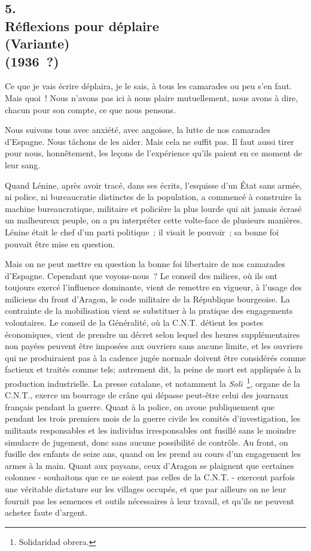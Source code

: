 \documentclass[french,twoside]{book} %
\begin{document}
\subsection[5. Réflexions pour déplaire, (Variante) (1936 ?)]{5. \\
Réflexions pour déplaire \\
(Variante) \\
(1936 ?)}
\noindent \par
Ce que je vais écrire déplaira, je le sais, à tous les camarades ou peu s'en faut. Mais quoi ! Nous n'avons pas ici à nous plaire mutuellement, nous avons à dire, chacun pour son compte, ce que nous pensons.\par
Nous suivons tous avec anxiété, avec angoisse, la lutte de nos camarades d'Espagne. Nous tâchons de les aider. Mais cela ne suffit pas. Il faut aussi tirer pour nous, honnêtement, les leçons de l'expérience qu'ils paient en ce moment de leur sang.\par
\par
Quand Lénine, après avoir tracé, dans ses écrits, l'esquisse d'un État sans armée, ni police, ni bureaucratie distinctes de la population, a commencé à construire la machine bureaucratique, militaire et policière la plus lourde qui ait jamais écrasé un malheureux peuple, on a pu interpréter cette volte-face de plusieurs manières. Lénine était le chef d'un parti politique ; il visait le pouvoir ; sa bonne foi pouvait être mise en question.\par
Mais on ne peut mettre en question la bonne foi libertaire de nos cama­rades d'Espagne. Cependant que voyons-nous ? Le conseil des milices, où ils ont toujours exercé l'influence dominante, vient de remettre en vigueur, à l'usage des miliciens du front d'Aragon, le code militaire de la République bourgeoise. La contrainte de la mobilisation vient se substituer à la pratique des engagements volontaires. Le conseil de la Généralité, où la C.N.T. détient les postes économiques, vient de prendre un décret selon lequel des heures supplémentaires non payées peuvent être imposées aux ouvriers sans aucune limite, et les ouvriers qui ne produiraient pas à la cadence jugée normale doivent être considérés comme factieux et traités comme tels; autrement dit, la peine de mort est appliquée à la production industrielle. La presse catalane, et notamment la {\itshape Soli} \footnote{Solidaridad obrera.}, organe de la C.N.T., exerce un bourrage de crâne qui dépasse peut-être celui des journaux français pendant la guerre. Quant à la police, on avoue publiquement que pendant les trois premiers mois de la guerre civile les comités d'investigation, les militants responsables et les individus irresponsables ont fusillé sans le moindre simulacre de jugement, donc sans aucune possibilité de contrôle. Au front, on fusille des enfants de seize ans, quand on les prend au cours d'un engagement les armes à la main. Quant aux paysans, ceux d'Aragon se plaignent que certaines colonnes - souhaitons que ce ne soient pas celles de la C.N.T. - exercent parfois une véritable dictature sur les villages occupés, et que par ailleurs on ne leur fournit pas les semences et outils nécessaires à leur travail, et qu'ils ne peuvent acheter faute d'argent.\par
\end{document}
